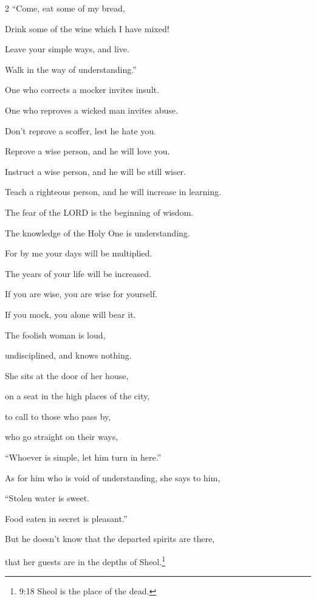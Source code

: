 \begin{multicols}{2}
\myverse{}“Come, eat some of my bread,

Drink some of the wine which I have mixed!


\myverse{}Leave your simple ways, and live.

Walk in the way of understanding.”


\vspace{\baselineskip} 
\myverse{}One who corrects a mocker invites insult.

One who reproves a wicked man invites abuse.


\myverse{}Don’t reprove a scoffer, lest he hate you.

Reprove a wise person, and he will love you.


\myverse{}Instruct a wise person, and he will be still wiser.

Teach a righteous person, and he will increase in learning.


\myverse{}The fear of the LORD is the beginning of wisdom.

The knowledge of the Holy One is understanding.


\myverse{}For by me your days will be multiplied.

The years of your life will be increased.


\myverse{}If you are wise, you are wise for yourself.

If you mock, you alone will bear it.


\vspace{\baselineskip} 
\myverse{}The foolish woman is loud,

undisciplined, and knows nothing.


\myverse{}She sits at the door of her house,

on a seat in the high places of the city,


\myverse{}to call to those who pass by,

who go straight on their ways,


\myverse{}“Whoever is simple, let him turn in here.”

As for him who is void of understanding, she says to him,


\myverse{}“Stolen water is sweet.

Food eaten in secret is pleasant.”


\myverse{}But he doesn’t know that the departed spirits are there,

that her guests are in the depths of Sheol.\footnote{9:18 Sheol is the place of the dead.}



\end{multicols}
